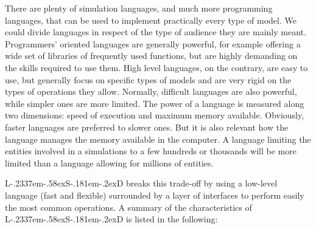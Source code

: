 \documentclass [11pt,a4paper] {book}
\def\LsD{{L\kern-.2337em\lower-.58ex\hbox{S}\kern-.181em\lower-.2ex\hbox{D}}\xspace}
\begin{document}
There are plenty of simulation languages, and much more programming languages, that can
be used to implement practically every type of model. We could divide languages in
respect of the type of audience they are mainly meant. Programmers' oriented languages
are generally powerful, for example offering a wide set of libraries of frequently used
functions, but are highly demanding on the skills required to use them. High level
languages, on the contrary, are easy to use, but generally focus on specific types of
models and are very rigid on the types of operations they allow. Normally, difficult languages are also powerful, while simpler ones are more limited. The power of a language is measured along two dimensions: speed of execution and maximum memory available. Obviously, faster languages are preferred to slower ones. But it is also relevant how the language manages the memory available in the computer. A language limiting the entities involved in a simulations to a few hundreds or thousands will be more limited than a language allowing for millions of entities.

\LsD breaks this trade-off by using a low-level language (fast and flexible) surrounded by a layer of
interfaces to perform easily the most common operations. A summary of the characteristics
of \LsD is listed in the following:
\end{document}
